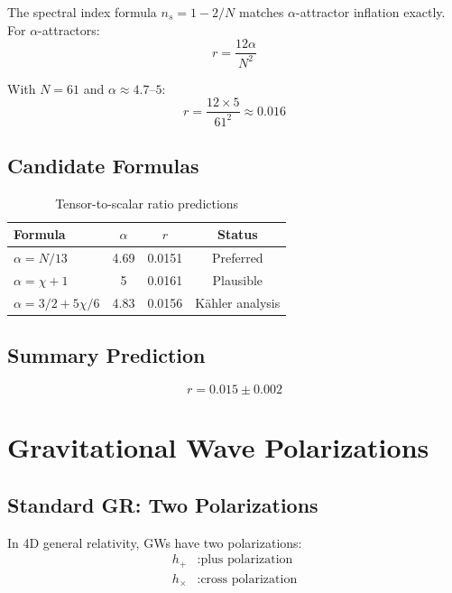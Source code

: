 \documentclass[12pt,a4paper]{article}
\begin{document}
The spectral index formula $n_s = 1 - 2/N$ matches $\alpha$-attractor inflation exactly. For $\alpha$-attractors:
\begin{equation}
r = \frac{12\alpha}{N^2}
\end{equation}

With $N = 61$ and $\alpha \approx 4.7$--$5$:
\begin{equation}
r = \frac{12 \times 5}{61^2} \approx 0.016
\end{equation}

\subsection{Candidate Formulas}

\begin{table}[h]
\centering
\begin{tabular}{lccc}
\toprule
Formula & $\alpha$ & $r$ & Status \\
\midrule
$\alpha = N/13$ & 4.69 & 0.0151 & Preferred \\
$\alpha = \chi + 1$ & 5 & 0.0161 & Plausible \\
$\alpha = 3/2 + 5\chi/6$ & 4.83 & 0.0156 & K\"ahler analysis \\
\bottomrule
\end{tabular}
\caption{Tensor-to-scalar ratio predictions}
\end{table}

\subsection{Summary Prediction}

\begin{equation}
\boxed{r = 0.015 \pm 0.002}
\end{equation}

\section{Gravitational Wave Polarizations}

\subsection{Standard GR: Two Polarizations}

In 4D general relativity, GWs have two polarizations:
\begin{align}
h_+ &: \text{plus polarization} \\
h_\times &: \text{cross polarization}
\end{align}
\end{document}
